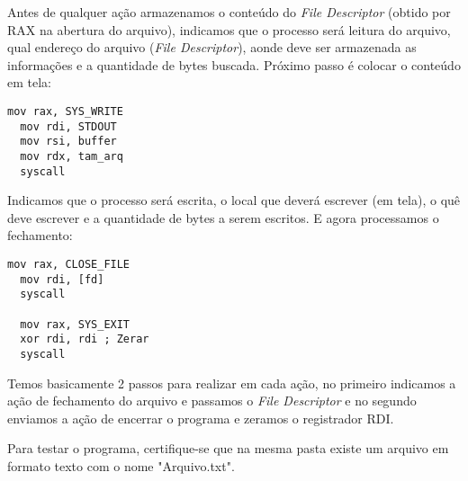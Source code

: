 Antes de qualquer ação armazenamos o conteúdo do \textit{File Descriptor} (obtido por RAX na abertura do arquivo), indicamos que o processo será leitura do arquivo, qual endereço do arquivo (\textit{File Descriptor}), aonde deve ser armazenada as informações e a quantidade de bytes buscada. Próximo passo é colocar o conteúdo em tela:
\begin{lstlisting}[]
  mov rax, SYS_WRITE
  mov rdi, STDOUT
  mov rsi, buffer
  mov rdx, tam_arq
  syscall
\end{lstlisting}

Indicamos que o processo será escrita, o local que deverá escrever (em tela), o quê deve escrever e a quantidade de bytes a serem escritos. E agora processamos o fechamento:
\begin{lstlisting}[]
  mov rax, CLOSE_FILE
  mov rdi, [fd]
  syscall

  mov rax, SYS_EXIT
  xor rdi, rdi ; Zerar
  syscall
\end{lstlisting}

Temos basicamente 2 passos para realizar em cada ação, no primeiro indicamos a ação de fechamento do arquivo e passamos o \textit{File Descriptor} e no segundo enviamos a ação de encerrar o programa e zeramos o registrador RDI.

Para testar o programa, certifique-se que na mesma pasta existe um arquivo em formato texto com o nome "Arquivo.txt".